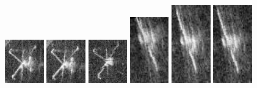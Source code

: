 \begin{figure}
    \includegraphics[width=0.15\textwidth]{chapters/images/dataset/all-class-images/valve/valve-76.jpg}
    \includegraphics[width=0.15\textwidth]{chapters/images/dataset/all-class-images/valve/valve-92.jpg}
    \includegraphics[width=0.15\textwidth]{chapters/images/dataset/all-class-images/valve/valve-106.jpg}
    \includegraphics[width=0.15\textwidth]{chapters/images/dataset/all-class-images/valve/valve-44.jpg}
    \includegraphics[width=0.15\textwidth]{chapters/images/dataset/all-class-images/valve/valve-34.jpg}
    \includegraphics[width=0.15\textwidth]{chapters/images/dataset/all-class-images/valve/valve-36.jpg}    
    

\end{figure}
